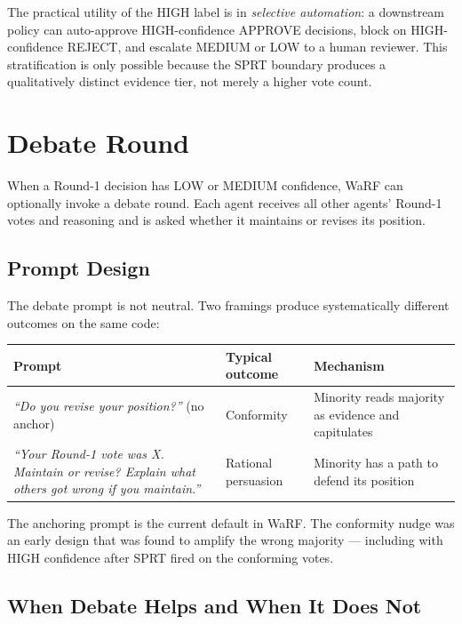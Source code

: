 \documentclass[11pt,a4paper]{article}
\begin{document}
The practical utility of the HIGH label is in \emph{selective automation}:
a downstream policy can auto-approve HIGH-confidence APPROVE decisions, block
on HIGH-confidence REJECT, and escalate MEDIUM or LOW to a human reviewer.
This stratification is only possible because the SPRT boundary produces a
qualitatively distinct evidence tier, not merely a higher vote count.

\section{Debate Round}

When a Round-1 decision has LOW or MEDIUM confidence, WaRF can optionally
invoke a debate round. Each agent receives all other agents' Round-1 votes
and reasoning and is asked whether it maintains or revises its position.

\subsection{Prompt Design}

The debate prompt is not neutral. Two framings produce systematically
different outcomes on the same code:

\begin{center}
\begin{tabular}{p{5.5cm}p{2.5cm}p{4.5cm}}
\toprule
Prompt & Typical outcome & Mechanism \\
\midrule
\textit{``Do you revise your position?''} (no anchor)
  & Conformity
  & Minority reads majority as evidence and capitulates \\[0.5em]
\textit{``Your Round-1 vote was X. Maintain or revise? Explain what others got wrong if you maintain.''}
  & Rational persuasion
  & Minority has a path to defend its position \\
\bottomrule
\end{tabular}
\end{center}

The anchoring prompt is the current default in WaRF. The conformity nudge
was an early design that was found to amplify the wrong majority — including
with HIGH confidence after SPRT fired on the conforming votes.

\subsection{When Debate Helps and When It Does Not}
\end{document}
